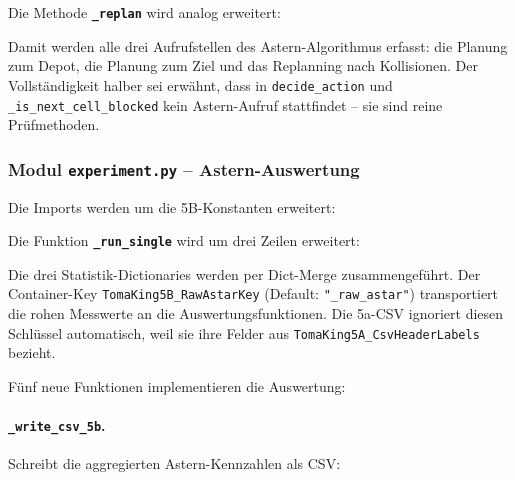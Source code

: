 Die Methode \textbf{\texttt{\_replan}} wird analog erweitert:



Damit werden alle drei Aufrufstellen des \acs{Astern}-Algorithmus erfasst: die Planung zum Depot, die Planung zum Ziel und das Replanning nach Kollisionen. Der Vollständigkeit halber sei erwähnt, dass in \texttt{decide\_action} und \texttt{\_is\_next\_cell\_blocked} kein \acs{Astern}-Aufruf stattfindet -- sie sind reine Prüfmethoden.


\subsubsection{Modul \texttt{experiment.py} – \acs{Astern}-Auswertung}

Die Imports werden um die 5B-Konstanten erweitert:



Die Funktion \textbf{\texttt{\_run\_single}} wird um drei Zeilen erweitert:



Die drei Statistik-Dictionaries werden per Dict-Merge zusammengeführt. Der Container-Key \texttt{TomaKing5B\_RawAstarKey} (Default: \texttt{"\_raw\_astar"}) transportiert die rohen Messwerte an die Auswertungsfunktionen. Die 5a-CSV ignoriert diesen Schlüssel automatisch, weil sie ihre Felder aus \texttt{TomaKing5A\_CsvHeaderLabels} bezieht.

Fünf neue Funktionen implementieren die Auswertung:

\paragraph{\texttt{\_write\_csv\_5b}.}
Schreibt die aggregierten \acs{Astern}-Kennzahlen als CSV:

